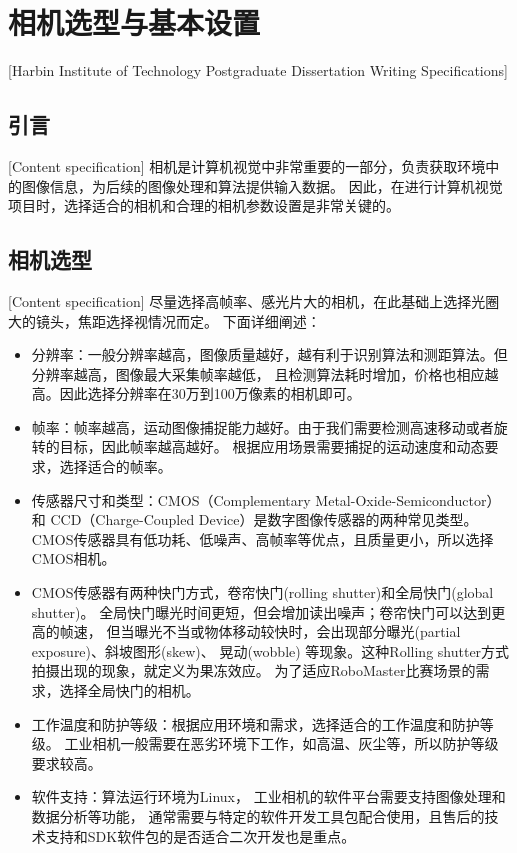 

\chapter[相机选型与基本设置]{相机选型与基本设置}[Harbin Institute of Technology Postgraduate Dissertation Writing Specifications]

\section{引言}[Content specification]
相机是计算机视觉中非常重要的一部分，负责获取环境中的图像信息，为后续的图像处理和算法提供输入数据。
因此，在进行计算机视觉项目时，选择适合的相机和合理的相机参数设置是非常关键的。

\section{相机选型}[Content specification]
尽量选择高帧率、感光片大的相机，在此基础上选择光圈大的镜头，焦距选择视情况而定。
下面详细阐述：\par

\begin{itemize}[itemindent=2em]
    \item 分辨率：一般分辨率越高，图像质量越好，越有利于识别算法和测距算法。但分辨率越高，图像最大采集帧率越低，
    且检测算法耗时增加，价格也相应越高。因此选择分辨率在30万到100万像素的相机即可。
    \item 帧率：帧率越高，运动图像捕捉能力越好。由于我们需要检测高速移动或者旋转的目标，因此帧率越高越好。
    根据应用场景需要捕捉的运动速度和动态要求，选择适合的帧率。
    \item 传感器尺寸和类型：CMOS（Complementary Metal-Oxide-Semiconductor）和 CCD（Charge-Coupled Device）是数字图像传感器的两种常见类型。
    CMOS传感器具有低功耗、低噪声、高帧率等优点，且质量更小，所以选择CMOS相机。
    \item CMOS传感器有两种快门方式，卷帘快门(rolling shutter)和全局快门(global shutter)。
    全局快门曝光时间更短，但会增加读出噪声；卷帘快门可以达到更高的帧速，
    但当曝光不当或物体移动较快时，会出现部分曝光(partial exposure)、斜坡图形(skew)、
    晃动(wobble) 等现象。这种Rolling shutter方式拍摄出现的现象，就定义为果冻效应。
    为了适应RoboMaster比赛场景的需求，选择全局快门的相机。
    \item 工作温度和防护等级：根据应用环境和需求，选择适合的工作温度和防护等级。
    工业相机一般需要在恶劣环境下工作，如高温、灰尘等，所以防护等级要求较高。
    \item 软件支持：算法运行环境为Linux，
    工业相机的软件平台需要支持图像处理和数据分析等功能，
    通常需要与特定的软件开发工具包配合使用，且售后的技术支持和SDK软件包的是否适合二次开发也是重点。

\end{itemize}


